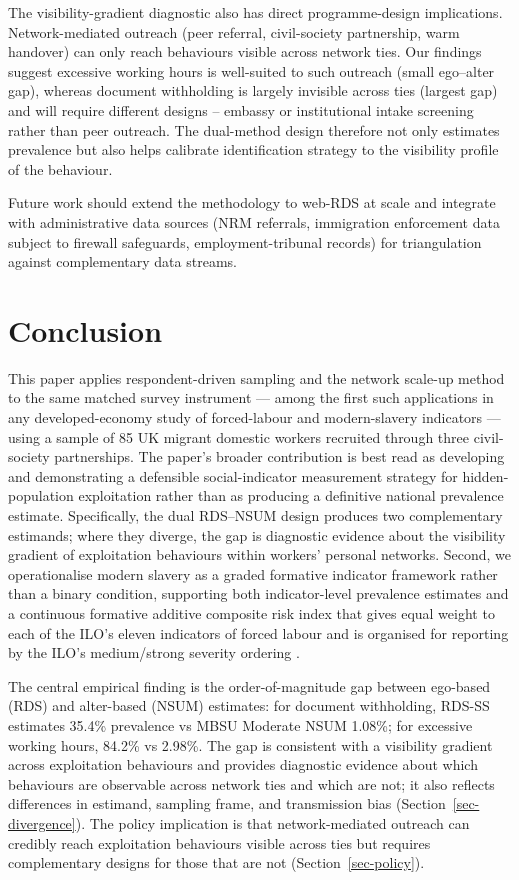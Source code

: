 \documentclass[
  12pt,
  letterpaper,
  DIV=11,
  numbers=noendperiod]{scrartcl}
\begin{document}
The visibility-gradient diagnostic also has direct programme-design
implications. Network-mediated outreach (peer referral, civil-society
partnership, warm handover) can only reach behaviours visible across
network ties. Our findings suggest excessive working hours is
well-suited to such outreach (small ego--alter gap), whereas document
withholding is largely invisible across ties (largest gap) and will
require different designs -- embassy or institutional intake screening
rather than peer outreach. The dual-method design therefore not only
estimates prevalence but also helps calibrate identification strategy to
the visibility profile of the behaviour.

Future work should extend the methodology to web-RDS at scale and
integrate with administrative data sources (NRM referrals, immigration
enforcement data subject to firewall safeguards, employment-tribunal
records) for triangulation against complementary data streams.

\section{Conclusion}\label{sec-conclusion}

This paper applies respondent-driven sampling and the network scale-up
method to the same matched survey instrument --- among the first such
applications in any developed-economy study of forced-labour and
modern-slavery indicators --- using a sample of 85 UK migrant domestic
workers recruited through three civil-society partnerships. The paper's
broader contribution is best read as developing and demonstrating a
defensible social-indicator measurement strategy for hidden-population
exploitation rather than as producing a definitive national prevalence
estimate. Specifically, the dual RDS--NSUM design produces two
complementary estimands; where they diverge, the gap is diagnostic
evidence about the visibility gradient of exploitation behaviours within
workers' personal networks. Second, we operationalise modern slavery as
a graded formative indicator framework rather than a binary condition,
supporting both indicator-level prevalence estimates and a continuous
formative additive composite risk index that gives equal weight to each
of the ILO's eleven indicators of forced labour and is organised for
reporting by the ILO's medium/strong severity ordering
\autocite{hard24-ilo}.

The central empirical finding is the order-of-magnitude gap between
ego-based (RDS) and alter-based (NSUM) estimates: for document
withholding, RDS-SS estimates 35.4\% prevalence vs MBSU Moderate NSUM
1.08\%; for excessive working hours, 84.2\% vs 2.98\%. The gap is
consistent with a visibility gradient across exploitation behaviours and
provides diagnostic evidence about which behaviours are observable
across network ties and which are not; it also reflects differences in
estimand, sampling frame, and transmission bias
(Section~\ref{sec-divergence}). The policy implication is that
network-mediated outreach can credibly reach exploitation behaviours
visible across ties but requires complementary designs for those that
are not (Section~\ref{sec-policy}).
\end{document}
